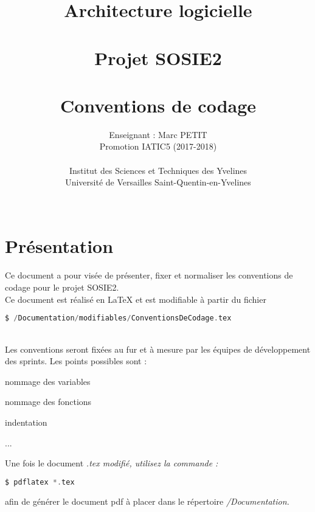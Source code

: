 \documentclass{report}
\title{Architecture logicielle\\
		\\
		Projet SOSIE2\\
		\\
		Conventions de codage}
\author{Enseignant : Marc PETIT\\
		Promotion IATIC5 (2017-2018)\\
		\\
        Institut des Sciences et Techniques des Yvelines\\
        Université de Versailles Saint-Quentin-en-Yvelines\\
		\\
        }
\begin{document}
\maketitle
\chapter*{Présentation}
Ce document a pour visée de présenter, fixer et normaliser les conventions de 
codage pour le projet SOSIE2.\\
Ce document est réalisé en \LaTeX{} et est modifiable à partir du fichier 
\begin{lstlisting}[language=c]
	$ /Documentation/modifiables/ConventionsDeCodage.tex
\end{lstlisting}
\\
Les conventions seront fixées au fur et à mesure par les équipes de développement 
des sprints. Les points possibles sont :
\begin{description}
	\item nommage des variables
	\item nommage des fonctions
	\item indentation
	\item ...
\end{description}
Une fois le document \itshape{.tex} modifié, utilisez la commande :
\begin{lstlisting}[language=c]
	$ pdflatex *.tex
\end{lstlisting}
afin de générer le document pdf à placer dans le répertoire \itshape{/Documentation}.
\end{document}
